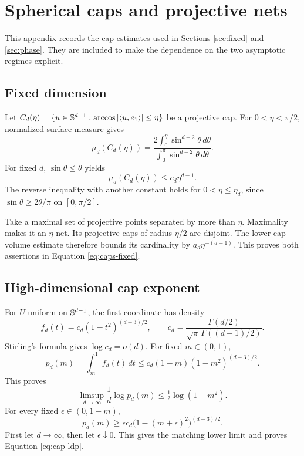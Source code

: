 \section{Spherical caps and projective nets}                        \label{app:caps}

This appendix records the cap estimates used in Sections
\ref{sec:fixed} and \ref{sec:phase}.  They are included to make the dependence
on the two asymptotic regimes explicit.

\subsection{Fixed dimension}

Let $C_d(\eta)=\{u\in\mathbb{S}^{d-1}:\arccos|\langle u,e_1\rangle|\leq\eta\}$ be a
projective cap.  For $0<\eta<\pi/2$, normalized surface measure gives
\begin{equation}
 \mu_d(C_d(\eta))
 =\frac{2\int_0^\eta\sin^{d-2}\theta\,d\theta}
        {\int_0^\pi\sin^{d-2}\theta\,d\theta}.                    \label{eq:projective-cap}
\end{equation}
For fixed $d$, $\sin\theta\leq\theta$ yields
\[
 \mu_d(C_d(\eta))\leq c_d\eta^{d-1}.
\]
The reverse inequality with another constant holds for
$0<\eta\leq\eta_d$, since $\sin\theta\geq2\theta/\pi$ on
$[0,\pi/2]$.

Take a maximal set of projective points separated by more than $\eta$.
Maximality makes it an $\eta$-net.  Its projective caps of radius $\eta/2$
are disjoint.  The lower cap-volume estimate therefore bounds its cardinality
by $a_d\eta^{-(d-1)}$.  This proves both assertions in
Equation \eqref{eq:caps-fixed}.

\subsection{High-dimensional cap exponent}

For $U$ uniform on $\mathbb{S}^{d-1}$, the first coordinate has density
\begin{equation}
 f_d(t)=c_d(1-t^2)^{(d-3)/2},\qquad
 c_d=\frac{\Gamma(d/2)}{\sqrt\pi\,\Gamma((d-1)/2)}.                \label{eq:coord-density}
\end{equation}
Stirling's formula gives $\log c_d=o(d)$.  For fixed $m\in(0,1)$,
\[
 p_d(m)=\int_m^1 f_d(t)\,dt
 \leq c_d(1-m)(1-m^2)^{(d-3)/2}.
\]
This proves
\[
 \limsup_{d\to\infty}\frac1d\log p_d(m)
 \leq\tfrac12\log(1-m^2).
\]
For every fixed $\epsilon\in(0,1-m)$,
\[
 p_d(m)\geq
 \epsilon c_d\big(1-(m+\epsilon)^2\big)^{(d-3)/2}.
\]
First let $d\to\infty$, then let $\epsilon\downarrow0$.  This gives the
matching lower limit and proves Equation \eqref{eq:cap-ldp}.

